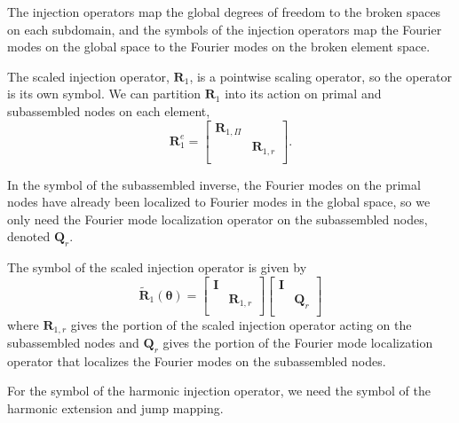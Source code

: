 The injection operators map the global degrees of freedom to the broken spaces on each subdomain, and the symbols of the injection operators map the Fourier modes on the global space to the Fourier modes on the broken element space.

The scaled injection operator, $\mathbf{R}_1$, is a pointwise scaling operator, so the operator is its own symbol.
We can partition $\mathbf{R}_1$ into its action on primal and subassembled nodes on each element,
\begin{equation}
\mathbf{R}_1^e =
\begin{bmatrix}
\mathbf{R}_{1, \Pi} &                    \\
                    & \mathbf{R}_{1, r}  \\
\end{bmatrix}.
\end{equation}

In the symbol of the subassembled inverse, the Fourier modes on the primal nodes have already been localized to Fourier modes in the global space, so we only need the Fourier mode localization operator on the subassembled nodes, denoted $\mathbf{Q}_r$.

\begin{definition}
The symbol of the scaled injection operator is given by
\begin{equation}
\tilde{\mathbf{R}}_1 \left( \boldsymbol{\theta} \right) =
\begin{bmatrix}
\mathbf{I} &                    \\
           & \mathbf{R}_{1, r}  \\
\end{bmatrix}
\begin{bmatrix}
\mathbf{I} &                 \\
           & \mathbf{Q}_{r}  \\
\end{bmatrix}
\end{equation}
where $\mathbf{R}_{1, r}$ gives the portion of the scaled injection operator acting on the subassembled nodes and $\mathbf{Q}_r$ gives the portion of the Fourier mode localization operator that localizes the Fourier modes on the subassembled nodes.
\label{def:scaled_injection_symbol}
\end{definition}

For the symbol of the harmonic injection operator, we need the symbol of the harmonic extension and jump mapping.

